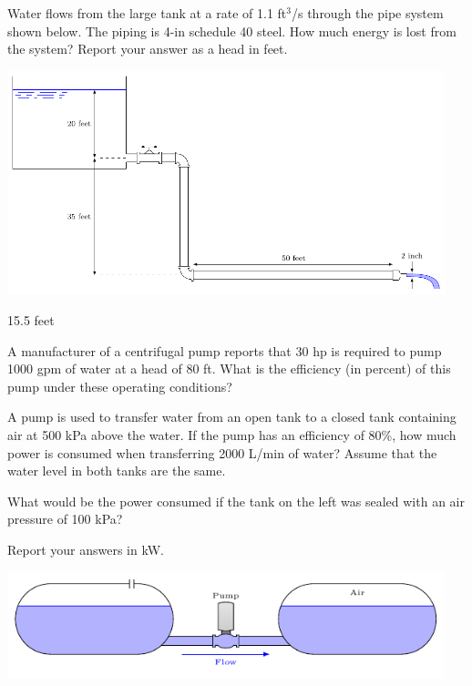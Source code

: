 \documentclass[multi,preview,varwidth=false,border=5,12pt]{standalone}
\begin{document}
\begin{question}

Water flows from the large tank at a rate of 1.1 ft$^3$/s through the pipe system shown below.  The piping is 4-in schedule 40 steel.  How much energy is lost from the system?  Report your answer as a head in feet.

\includegraphics[width=5in]{imgs/TankGateElbows.pdf}


\begin{solution}
15.5 feet
\end{solution}

\end{question}


\begin{question}

A manufacturer of a centrifugal pump reports that 30 hp is required to pump 1000 gpm of water at a head of 80 ft.  What is the efficiency (in percent) of this pump under these operating conditions?

\end{question}


\begin{question}

A pump is used to transfer water from an open tank to a closed tank containing air at 500 kPa above the water.  If the pump has an efficiency of 80\%, how much power is consumed when transferring 2000 L/min of water?  Assume that the water level in both tanks are the same.

What would be the power consumed if the tank on the left was sealed with an air pressure of 100 kPa?

Report your answers in kW.

\includegraphics[width=5in]{imgs/PumpTransfer.pdf}


\end{question}
\end{document}
